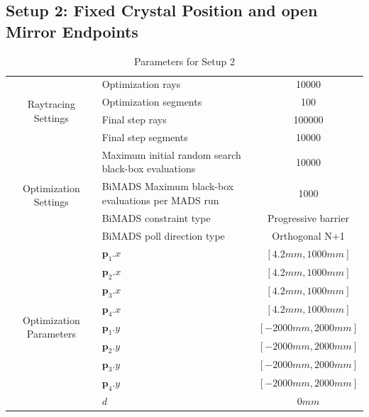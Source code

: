\documentclass[a4paper,10pt]{article}
\renewcommand{\vec}[1]{\mathbf{#1}}
\begin{document}
    \subsection{Setup 2: Fixed Crystal Position and open Mirror Endpoints}
    
    \begin{table}
    \centering
    \setlength\tabcolsep{8pt}
    \renewcommand{\arraystretch}{1.5}
    \begin{tabular}{| c | p{40mm} | c |}
        \hline
        \multirow{4}{*}{Raytracing Settings} & Optimization rays & 10000 \\
        \cline{2-3}
        & Optimization segments & 100 \\
        \cline{2-3}
        & Final step rays & 100000 \\
        \cline{2-3}
        & Final step segments & 10000 \\
        \hline
        \multirow{4}{*}{Optimization Settings} & Maximum initial random search black-box evaluations & 10000 \\
        \cline{2-3}
        & BiMADS Maximum black-box evaluations per MADS run & 1000 \\
        \cline{2-3}
        & BiMADS constraint type & Progressive barrier \\
        \cline{2-3}
        & BiMADS poll direction type & Orthogonal N+1 \\
        \hline
        \multirow{9}{*}{Optimization Parameters} & 
        $\vec{p}_1.x$ & $[4.2mm, 1000mm]$ \\
        \cline{2-3}
        & $\vec{p}_2.x$ & $[4.2mm, 1000mm]$\\
        \cline{2-3}
        & $\vec{p}_3.x$ & $[4.2mm, 1000mm]$\\ 
        \cline{2-3}
        & $\vec{p}_4.x$ & $[4.2mm, 1000mm]$\\ 
        \cline{2-3}
        & $\vec{p}_1.y$ & $[-2000mm, 2000mm]$ \\
        \cline{2-3}
        & $\vec{p}_2.y$ & $[-2000mm, 2000mm]$\\
        \cline{2-3}
        & $\vec{p}_3.y$ & $[-2000mm, 2000mm]$\\ 
        \cline{2-3}
        & $\vec{p}_4.y$ & $[-2000mm, 2000mm]$\\ 
        \cline{2-3}
        & $d$ & $0mm$\\ 
        \hline 
    \end{tabular}
    \caption{Parameters for Setup 2}
    \end{table}
    
\end{document}
